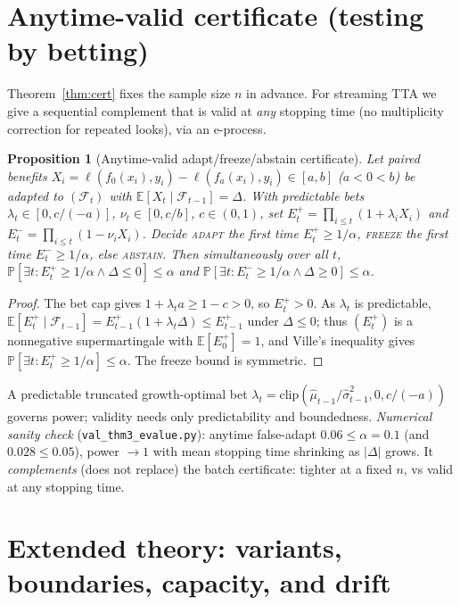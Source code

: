 \documentclass[conference]{IEEEtran}
\theoremstyle{plain}
\newtheorem{proposition}{Proposition}
\theoremstyle{definition}
\newcommand{\E}{\mathbb{E}}
\renewcommand{\Pr}{\mathbb{P}}
\begin{document}
\section{Anytime-valid certificate (testing by betting)}\label{app:anytime}
Theorem~\ref{thm:cert} fixes the sample size $n$ in advance. For streaming TTA we give a
sequential complement that is valid at \emph{any} stopping time (no multiplicity correction
for repeated looks), via an e-process.
\begin{proposition}[Anytime-valid adapt/freeze/abstain certificate]\label{thm:anytime}
Let paired benefits $X_i=\ell(f_0(x_i),y_i)-\ell(f_a(x_i),y_i)\in[a,b]$ ($a<0<b$) be
adapted to $(\mathcal F_t)$ with $\E[X_t\mid\mathcal F_{t-1}]=\Delta$. With predictable
bets $\lambda_t\in[0,c/(-a)]$, $\nu_t\in[0,c/b]$, $c\in(0,1)$, set
$E_t^{+}=\prod_{i\le t}(1+\lambda_i X_i)$ and $E_t^{-}=\prod_{i\le t}(1-\nu_i X_i)$.
Decide \textsc{adapt} the first time $E_t^{+}\ge1/\alpha$, \textsc{freeze} the first time
$E_t^{-}\ge1/\alpha$, else \textsc{abstain}. Then simultaneously over all $t$,
$\Pr[\exists t: E_t^{+}\ge1/\alpha \wedge \Delta\le0]\le\alpha$ and
$\Pr[\exists t: E_t^{-}\ge1/\alpha \wedge \Delta\ge0]\le\alpha$.
\end{proposition}
\begin{proof}
The bet cap gives $1+\lambda_t a\ge1-c>0$, so $E_t^{+}>0$. As $\lambda_t$ is predictable,
$\E[E_t^{+}\mid\mathcal F_{t-1}]=E_{t-1}^{+}(1+\lambda_t\Delta)\le E_{t-1}^{+}$ under
$\Delta\le0$; thus $(E_t^{+})$ is a nonnegative supermartingale with $\E[E_0^{+}]=1$, and
Ville's inequality gives $\Pr[\exists t: E_t^{+}\ge1/\alpha]\le\alpha$. The freeze bound
is symmetric. \qedhere
\end{proof}
\noindent A predictable truncated growth-optimal bet
$\lambda_t=\mathrm{clip}(\widehat\mu_{t-1}/\widehat\sigma^2_{t-1},0,c/(-a))$ governs power;
validity needs only predictability and boundedness. \emph{Numerical sanity check}
(\texttt{val\_thm3\_evalue.py}): anytime false-adapt $0.06\le\alpha{=}0.1$ (and
$0.028\le0.05$), power $\to1$ with mean stopping time shrinking as $|\Delta|$ grows. It
\emph{complements} (does not replace) the batch certificate: tighter at a fixed $n$, vs
valid at any stopping time.

\section{Extended theory: variants, boundaries, capacity, and drift}\label{app:theory-ext}
\end{document}
